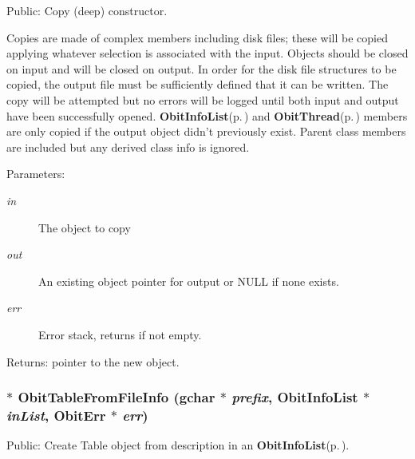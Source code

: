 Public: Copy (deep) constructor. 

Copies are made of complex members including disk files; these will be copied applying whatever selection is associated with the input. Objects should be closed on input and will be closed on output. In order for the disk file structures to be copied, the output file must be sufficiently defined that it can be written. The copy will be attempted but no errors will be logged until both input and output have been successfully opened. {\bf Obit\-Info\-List}{\rm (p.\,\pageref{structObitInfoList})} and {\bf Obit\-Thread}{\rm (p.\,\pageref{structObitThread})} members are only copied if the output object didn't previously exist. Parent class members are included but any derived class info is ignored. \begin{Desc}
\item[Parameters:]
\begin{description}
\item[{\em in}]The object to copy \item[{\em out}]An existing object pointer for output or NULL if none exists. \item[{\em err}]Error stack, returns if not empty. \end{description}
\end{Desc}
\begin{Desc}
\item[Returns:]pointer to the new object. \end{Desc}
\subsubsection{$\ast$ Obit\-Table\-From\-File\-Info (gchar $\ast$ {\em prefix}, {\bf Obit\-Info\-List} $\ast$ {\em in\-List}, {\bf Obit\-Err} $\ast$ {\em err})}\label{ObitTable_8c_a36}


Public: Create Table object from description in an {\bf Obit\-Info\-List}{\rm (p.\,\pageref{structObitInfoList})}. 

